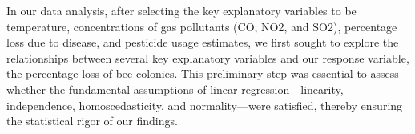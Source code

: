 \documentclass[
  letterpaper,
  DIV=11,
  numbers=noendperiod]{scrartcl}
\begin{document}
In our data analysis, after selecting the key explanatory variables to
be temperature, concentrations of gas pollutants (CO, NO2, and SO2),
percentage loss due to disease, and pesticide usage estimates, we first
sought to explore the relationships between several key explanatory
variables and our response variable, the percentage loss of bee
colonies. This preliminary step was essential to assess whether the
fundamental assumptions of linear regression---linearity, independence,
homoscedasticity, and normality---were satisfied, thereby ensuring the
statistical rigor of our findings.

\begin{figure}

\end{figure}
\end{document}
